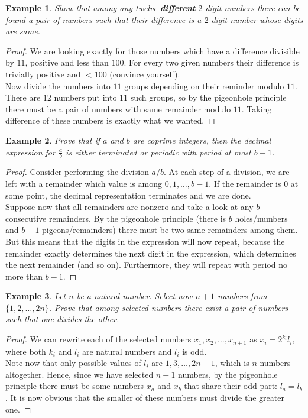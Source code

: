 \documentclass[11pt,a5paper]{article}
\newtheorem{theorem}{Example}
\begin{document}
\begin{theorem}
Show that among any twelve \textbf{different} $2$-digit numbers there can be found a pair of numbers such that their difference is a $2$-digit number whose digits are same.
\end{theorem}
\begin{proof}
We are looking exactly for those numbers which have a difference divisible by $11$, positive and less than $100$. For every two given numbers their difference is trivially positive and $<100$ (convince yourself).\\
Now divide the numbers into $11$ groups depending on their reminder modulo $11$. There are $12$ numbers put into $11$ such groups, so by the pigeonhole principle there must be a pair of numbers with same remainder modulo $11$. Taking difference of these numbers is exactly what we wanted.
\end{proof}

\begin{theorem}
Prove that if $a$ and $b$ are coprime integers, then the decimal expression for $\frac{a}{b}$ is either terminated or periodic with period at most $b - 1$. 
\end{theorem}
\begin{proof}
Consider performing the division $a/b$. At each step of a division, we are left with a remainder which value is among $0,1,\dots,b-1$. If the remainder is $0$ at some point, the decimal representation terminates and we are done. \\
Suppose now that all remainders are nonzero and take a look at any $b$ consecutive remainders. By the pigeonhole principle (there is $b$ holes/numbers and $b-1$ pigeons/remainders) there must be two same remainders among them. \\
But this means that the digits in the expression will now repeat, because the remainder exactly determines the next digit in the expression, which determines the next remainder (and so on). Furthermore, they will repeat with period no more than $b - 1$.
\end{proof}

\begin{theorem}
Let $n$ be a natural number. Select now $n + 1$ numbers from  $\{1,2,\dots,2n\}$. Prove that among selected numbers there exist a pair of numbers such that one divides the other.
\end{theorem}
\begin{proof}
We can rewrite each of the selected numbers $x_{1}, x_{2}, \dots,x_{n+1}$ as $x_{i} = 2^{k_{i}}l_{i}$, where both $k_{i}$ and $l_{i}$ are natural numbers and  $l_{i}$ is odd. \\
Note now that only possible values of $l_{i}$ are $1,3,\dots,2n - 1$, which is $n$ numbers altogether. Hence, since we have selected $n+1$ numbers, by the pigeonhole principle there must be some numbers $x_{a}$ and $x_{b}$ that share their odd part: $l_{a} = l_{b}$. It is now obvious that the smaller of these numbers must divide the greater one.
\end{proof}
\end{document}

